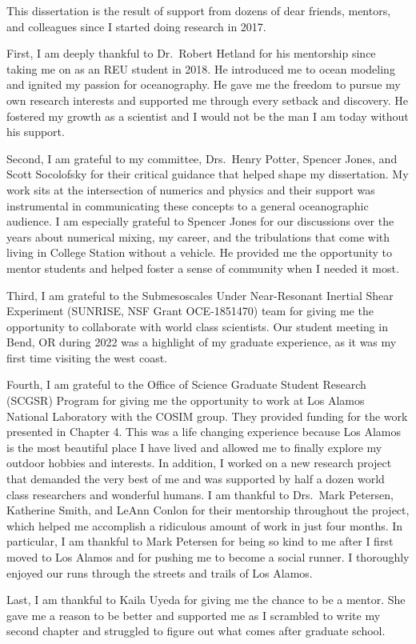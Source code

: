 
\begin{acknowledgements}
This dissertation is the result of support from dozens of dear friends, mentors, and colleagues since I started doing research in 2017.

First, I am deeply thankful to Dr.~Robert Hetland for his mentorship since taking me on as an REU student in 2018. He introduced me to ocean modeling and ignited my passion for oceanography. He gave me the freedom to pursue my own research interests and supported me through every setback and discovery. He fostered my growth as a scientist and I would not be the man I am today without his support. 

Second, I am grateful to my committee, Drs.~Henry Potter, Spencer Jones, and Scott Socolofsky for their critical guidance that helped shape my dissertation. My work sits at the intersection of numerics and physics and their support was instrumental in communicating these concepts to a general oceanographic audience. I am especially grateful to Spencer Jones for our discussions over the years about numerical mixing, my career, and the tribulations that come with living in College Station without a vehicle. He provided me the opportunity to mentor students and helped foster a sense of community when I needed it most. 

Third, I am grateful to the Submesoscales Under Near-Resonant Inertial Shear Experiment (SUNRISE, NSF Grant OCE-1851470) team for giving me the opportunity to collaborate with world class scientists. Our student meeting in Bend, OR during 2022 was a highlight of my graduate experience, as it was my first time visiting the west coast. 

Fourth, I am grateful to the Office of Science Graduate Student Research (SCGSR) Program for giving me the opportunity to work at Los Alamos National Laboratory with the COSIM group. They provided funding for the work presented in Chapter 4. This was a life changing experience because Los Alamos is the most beautiful place I have lived and allowed me to finally explore my outdoor hobbies and interests. In addition, I worked on a new research project that demanded the very best of me and was supported by half a dozen world class researchers and wonderful humans. I am thankful to Drs.~Mark Petersen, Katherine Smith, and LeAnn Conlon for their mentorship throughout the project, which helped me accomplish a ridiculous amount of work in just four months. In particular, I am thankful to Mark Petersen for being so kind to me after I first moved to Los Alamos and for pushing me to become a social runner. I thoroughly enjoyed our runs through the streets and trails of Los Alamos. 

Last, I am thankful to Kaila Uyeda for giving me the chance to be a mentor. She gave me a reason to be better and supported me as I scrambled to write my second chapter and struggled to figure out what comes after graduate school. 
\end{acknowledgements}